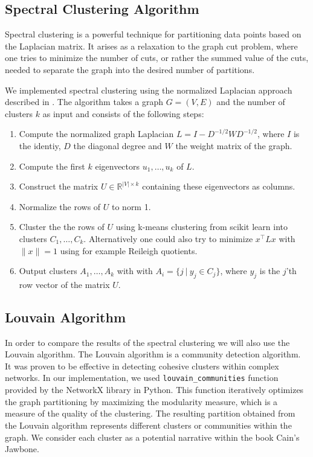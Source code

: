 \documentclass[a4paper]{article}
\begin{document}
\subsection{Spectral Clustering Algorithm}

Spectral clustering is a powerful technique for partitioning data points based on the Laplacian matrix. It arises as a relaxation to the graph cut problem, where one tries to minimize the number of cuts, or rather the summed value of the cuts, needed to separate the graph into the desired number of partitions.

We implemented spectral clustering using the normalized Laplacian approach described in \cite{spectral}. The algorithm takes a graph $G = (V, E)$ and the number of clusters $k$ as input and consists of the following steps:

\begin{enumerate}
    \item Compute the normalized graph Laplacian $L = I - D^{-1/2} W D^{-1/2}$, where $I$ is the identiy, $D$ the diagonal degree and $W$ the weight matrix of the graph.
    \item Compute the first $k$ eigenvectors $u_1, \dots, u_k$ of $L$.
    \item Construct the matrix $U \in \mathbb{R}^{|V| \times k}$ containing these eigenvectors as columns.
    \item Normalize the rows of $U$ to norm 1.
    \item Cluster the the rows of $U$ using k-means clustering from scikit learn \cite{sklearn} into clusters $C_1, \dots, C_k$. Alternatively one could also try to minimize $x^\top L x$ with $\|x\|=1$ using for example Reileigh quotients.
    \item Output clusters $A_1, \dots, A_k$ with with $A_{i} = \{j \ | \ y_{j} \in C_{j}\}$, where $y_{j}$ is the $j$'th row vector of the matrix $U$.
\end{enumerate}




\subsection{Louvain Algorithm}

In order to compare the results of the spectral clustering we will also use the Louvain algorithm. The Louvain algorithm is a community detection algorithm. It was proven to be effective in detecting cohesive clusters within complex networks. In our implementation, we used \verb|louvain_communities| function provided by the NetworkX \cite{networkx} library in Python. This function iteratively optimizes the graph partitioning by maximizing the modularity measure, which is a measure of the quality of the clustering. The resulting partition obtained from the Louvain algorithm represents different clusters or communities within the graph. We consider each cluster as a potential narrative within the book Cain's Jawbone.
\end{document}
